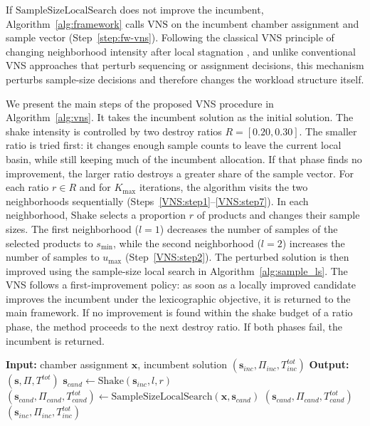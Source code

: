 \documentclass[11pt]{article}
\begin{document}
If \(\mathrm{SampleSizeLocalSearch}\) does not improve the incumbent,
Algorithm~\ref{alg:framework} calls \(\mathrm{VNS}\) on the incumbent
chamber assignment and sample vector (Step~\ref{step:fw-vns}).
Following the classical VNS principle of changing neighborhood
intensity after local stagnation \citep{LiaoCheng2007}, and unlike
conventional VNS approaches that perturb sequencing or assignment
decisions, this mechanism perturbs sample-size decisions and therefore
changes the workload structure itself.

We present the main steps of the proposed VNS procedure in
Algorithm~\ref{alg:vns}.
It takes the incumbent solution as the initial solution.
The shake intensity is controlled by two destroy ratios
\(R=[0.20,0.30]\).
The smaller ratio is tried first: it changes enough sample counts to
leave the current local basin, while still keeping much of the
incumbent allocation.
If that phase finds no improvement, the larger ratio destroys a
greater share of the sample vector.
For each ratio \(r\in R\) and for \(K_{\max}\) iterations, the
algorithm visits the two neighborhoods sequentially
(Steps~\ref{VNS:step1}--\ref{VNS:step7}).
In each neighborhood, \(\mathrm{Shake}\) selects a proportion \(r\) of
products and changes their sample sizes.
The first neighborhood (\(l=1\)) decreases the number of samples of
the selected products to \(s_{\min}\), while the second neighborhood
(\(l=2\)) increases the number of samples to \(u_{\max}\)
(Step~\ref{VNS:step2}).
The perturbed solution is then improved using the sample-size local
search in Algorithm~\ref{alg:sample_ls}.
The VNS follows a first-improvement policy: as soon as a locally
improved candidate improves the incumbent under the lexicographic
objective, it is returned to the main framework.
If no improvement is found within the shake budget of a ratio phase,
the method proceeds to the next destroy ratio.
If both phases fail, the incumbent is returned.

\begin{algorithm}[H]
\caption{VNS}
\label{alg:vns}
\label{alg:vns_fixed_destroy}
\label{alg:vns_short}
\begin{algorithmic}[1]
\State \textbf{Input:} chamber assignment \(\mathbf{x}\), incumbent solution \((\mathbf{s}_{inc},\Pi_{inc},T^{tot}_{inc})\)
\State \textbf{Output:} \((\mathbf{s},\Pi,T^{tot})\)
         \label{VNS:step1}
            \State \(\mathbf{s}_{cand}\leftarrow\mathrm{Shake}(\mathbf{s}_{inc},l,r)\) \label{VNS:step2}
            \State \((\mathbf{s}_{cand},\Pi_{cand},T^{tot}_{cand})\leftarrow\mathrm{SampleSizeLocalSearch}(\mathbf{x},\mathbf{s}_{cand})\)
                \State \Return \((\mathbf{s}_{cand},\Pi_{cand},T^{tot}_{cand})\)
            \EndIf
        \EndFor \label{VNS:step7}
    \EndFor
\EndFor
\State \Return \((\mathbf{s}_{inc},\Pi_{inc},T^{tot}_{inc})\)
\end{algorithmic}
\end{algorithm}
\end{document}
